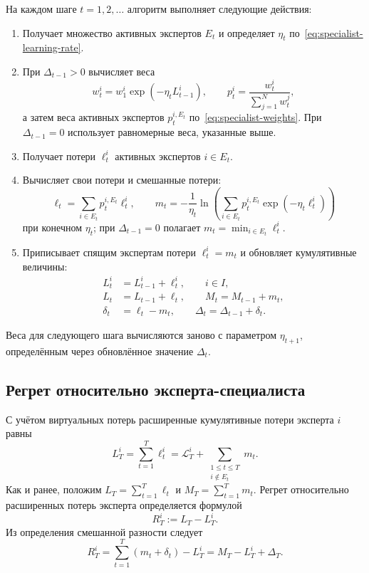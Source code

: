 \documentclass[a4paper,12pt]{article}
\theoremstyle{plain}
\theoremstyle{definition}
\theoremstyle{remark}
\numberwithin{equation}{section}
\begin{document}
На каждом шаге $t=1,2,\dots$ алгоритм выполняет следующие действия:
\begin{enumerate}
  \item Получает множество активных экспертов $E_t$ и определяет $\eta_t$ по~\eqref{eq:specialist-learning-rate}.
  \item При $\Delta_{t-1}>0$ вычисляет веса
  \[
  w_t^i=w_1^i\exp(-\eta_t L_{t-1}^i),
  \qquad
  p_t^i=\frac{w_t^i}{\sum_{j=1}^{N}w_t^j},
  \]
  а затем веса активных экспертов $p_t^{i,E_t}$ по~\eqref{eq:specialist-weights}. При $\Delta_{t-1}=0$ использует равномерные веса, указанные выше.
  \item Получает потери $\ell_t^i$ активных экспертов $i\in E_t$.
  \item Вычисляет свои потери и смешанные потери:
  \[
  \ell_t=\sum_{i\in E_t}p_t^{i,E_t}\ell_t^i,
  \qquad
  m_t=-\frac1{\eta_t}\ln\left(
       \sum_{i\in E_t}p_t^{i,E_t}\exp(-\eta_t\ell_t^i)\right)
  \]
  при конечном $\eta_t$; при $\Delta_{t-1}=0$ полагает $m_t=\min_{i\in E_t}\ell_t^i$.
  \item Приписывает спящим экспертам потери $\ell_t^i=m_t$ и обновляет кумулятивные величины:
  \[
  \begin{aligned}
  L_t^i&=L_{t-1}^i+\ell_t^i,\qquad i\in I,\\
  L_t&=L_{t-1}+\ell_t,\qquad M_t=M_{t-1}+m_t,\\
  \delta_t&=\ell_t-m_t,\qquad \Delta_t=\Delta_{t-1}+\delta_t.
  \end{aligned}
  \]
\end{enumerate}
Веса для следующего шага вычисляются заново с параметром $\eta_{t+1}$, определённым через обновлённое значение $\Delta_t$.

\subsection{Регрет относительно эксперта-специалиста}

С учётом виртуальных потерь расширенные кумулятивные потери эксперта $i$ равны
\[
L_T^i = \sum_{t=1}^{T}\ell_t^i
      = \mathcal{L}_T^i + \sum_{\substack{1\leqslant t\leqslant T\\i\notin E_t}}m_t.
\]
Как и ранее, положим $L_T=\sum_{t=1}^{T}\ell_t$ и $M_T=\sum_{t=1}^{T}m_t$. Регрет относительно расширенных потерь эксперта определяется формулой
\[
R_T^i := L_T-L_T^i.
\]
Из определения смешанной разности следует
\begin{equation}
\label{eq:extended-regret-decomposition}
R_T^i
= \sum_{t=1}^{T}(m_t+\delta_t)-L_T^i
= M_T-L_T^i+\Delta_T.
\end{equation}
\end{document}
